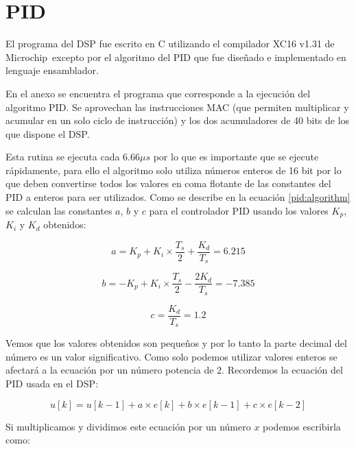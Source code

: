 \documentclass[12pt]{report}
\begin{document}
\section{PID}

El programa del DSP fue escrito en C utilizando el compilador XC16 v1.31 de Microchip\textregistered \ excepto por el algoritmo del PID que fue diseñado e implementado en lenguaje ensamblador. 

En el anexo se encuentra el programa que corresponde a la ejecución del algoritmo PID. Se aprovechan las instrucciones MAC (que permiten multiplicar y acumular en un solo ciclo de instrucción) y los dos acumuladores de 40 bits de los que dispone el DSP. 

%	

Esta rutina se ejecuta cada $6.66\mu s$ por lo que es importante que se ejecute rápidamente, para ello el algoritmo solo utiliza números enteros de 16 bit por lo que deben convertirse todos los valores en coma flotante de las constantes del PID a enteros para ser utilizados. Como se describe en la ecuación \ref{pid:algorithm} se calculan las constantes $a$, $b$ y $c$ para el controlador PID usando los valores $K_p$, $K_i$ y $K_d$ obtenidos:

\begin{equation}
	a = K_p + K_i \times \frac{T_s}{2} + \frac{K_d}{T_s} = 6.215
\end{equation}

\begin{equation}
	b = -K_p + K_i \times \frac{T_s}{2} - \frac{2K_d}{T_s} = -7.385
\end{equation}

\begin{equation}
	c = \frac{K_d}{T_s} = 1.2
\end{equation}

Vemos que los valores obtenidos son pequeños y por lo tanto la parte decimal del número es un valor significativo. Como solo podemos utilizar valores enteros se afectará a la ecuación por un número potencia de 2. Recordemos la ecuación del PID usada en el DSP:

\begin{equation}
	u[k] = u[k-1] + a \times e[k] + b \times e[k-1] + c \times e[k-2]
\end{equation}


Si multiplicamos y dividimos este ecuación por un número $x$ podemos escribirla como:
\end{document}
